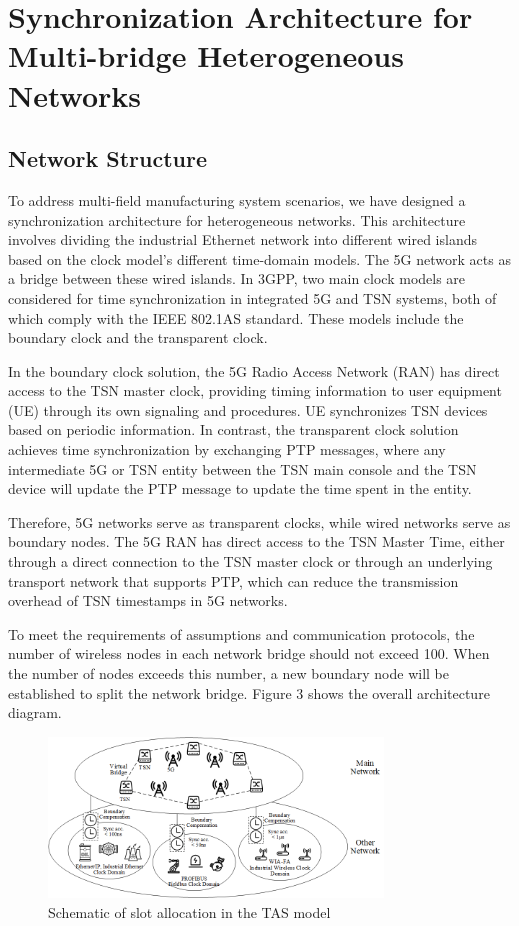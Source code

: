 \documentclass[english]{cccconf}
\begin{document}
\section{ Synchronization Architecture for Multi-bridge Heterogeneous Networks}
\subsection{Network Structure}
To address multi-field manufacturing system scenarios, we have designed a synchronization architecture for heterogeneous networks. This architecture involves dividing the industrial Ethernet network into different wired islands based on the clock model's different time-domain models. The 5G network acts as a bridge between these wired islands. In 3GPP, two main clock models are considered for time synchronization in integrated 5G and TSN systems, both of which comply with the IEEE 802.1AS standard. These models include the boundary clock and the transparent clock\cite{9615318}.

In the boundary clock solution, the 5G Radio Access Network (RAN) has direct access to the TSN master clock, providing timing information to user equipment (UE) through its own signaling and procedures. UE synchronizes TSN devices based on periodic information. In contrast, the transparent clock solution achieves time synchronization by exchanging PTP messages, where any intermediate 5G or TSN entity between the TSN main console and the TSN device will update the PTP message to update the time spent in the entity.

Therefore, 5G networks serve as transparent clocks, while wired networks serve as boundary nodes. The 5G RAN has direct access to the TSN Master Time, either through a direct connection to the TSN master clock or through an underlying transport network that supports PTP, which can reduce the transmission overhead of TSN timestamps in 5G networks.

To meet the requirements of assumptions and communication protocols, the number of wireless nodes in each network bridge should not exceed 100. When the number of nodes exceeds this number, a new boundary node will be established to split the network bridge. Figure 3 shows the overall architecture diagram.
\begin{figure}[htbp]
	\centering
	\setcounter{figure}{3}
	\includegraphics[width=3.5in]{fig17.png}
	\caption{Schematic of slot allocation in the TAS model}
\end{figure}
\end{document}
